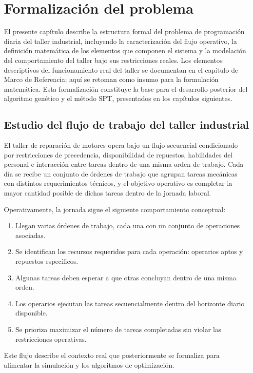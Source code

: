 \chapter{Formalización del problema}

El presente capítulo describe la estructura formal del problema de programación diaria del taller industrial,
incluyendo la caracterización del flujo operativo, la definición matemática de los elementos que componen el
sistema y la modelación del comportamiento del taller bajo sus restricciones reales. Los elementos
descriptivos del funcionamiento real del taller se documentan en el capítulo de Marco de Referencia;
aquí se retoman como insumo para la formulación matemática. Esta formalización constituye la base para
el desarrollo posterior del algoritmo genético y el método SPT, presentados en los capítulos siguientes.

\section{Estudio del flujo de trabajo del taller industrial}

El taller de reparación de motores opera bajo un flujo secuencial condicionado por restricciones de precedencia,
disponibilidad de repuestos, habilidades del personal e interacción entre tareas dentro de una misma orden
de trabajo. Cada día se recibe un conjunto de órdenes de trabajo que agrupan tareas mecánicas con distintos
requerimientos técnicos, y el objetivo operativo es completar la mayor cantidad posible de dichas tareas dentro
de la jornada laboral.

Operativamente, la jornada sigue el siguiente comportamiento conceptual:
\begin{enumerate}
    \item Llegan varias órdenes de trabajo, cada una con un conjunto de operaciones asociadas.
    \item Se identifican los recursos requeridos para cada operación: operarios aptos y repuestos específicos.
    \item Algunas tareas deben esperar a que otras concluyan dentro de una misma orden.
    \item Los operarios ejecutan las tareas secuencialmente dentro del horizonte diario disponible.
    \item Se prioriza maximizar el número de tareas completadas sin violar las restricciones operativas.
\end{enumerate}

Este flujo describe el contexto real que posteriormente se formaliza para alimentar la simulación y los algoritmos
 de optimización.

